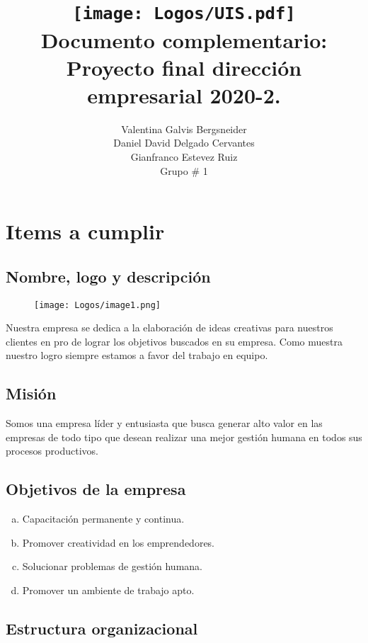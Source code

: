 \documentclass[10pt]{article}
\title{
    \vspace{-2cm}
    \texttt{[image: Logos/UIS.pdf]} \\
    Documento complementario: \\ Proyecto final dirección empresarial 2020-2.}
\author{Valentina Galvis Bergsneider \\ 
    Daniel David Delgado Cervantes \\ 
    Gianfranco Estevez Ruiz \\ 
    Grupo \# 1
}
\begin{document}
    \maketitle

\section{Items a cumplir}

\subsection{Nombre, logo y descripción}

    \begin{figure}[H]
        \centering
        \texttt{[image: Logos/image1.png]}
    \end{figure}

    Nuestra empresa se dedica a la elaboración de ideas creativas para nuestros clientes en pro de lograr los objetivos buscados en su empresa. Como muestra nuestro logro siempre estamos a favor del trabajo en equipo.


\subsection{Misión}

    Somos una empresa líder y entusiasta que busca generar alto valor en las empresas de todo tipo que desean realizar una mejor gestión humana en todos sus procesos productivos. 

\subsection{Objetivos de la empresa}
    \begin{enumerate}[a.]
        \item Capacitación permanente y continua.
        \item Promover creatividad en los emprendedores.
        \item Solucionar problemas de gestión humana.
        \item Promover un ambiente de trabajo apto.
    \end{enumerate}
    
\subsection{Estructura organizacional}
\end{document}
